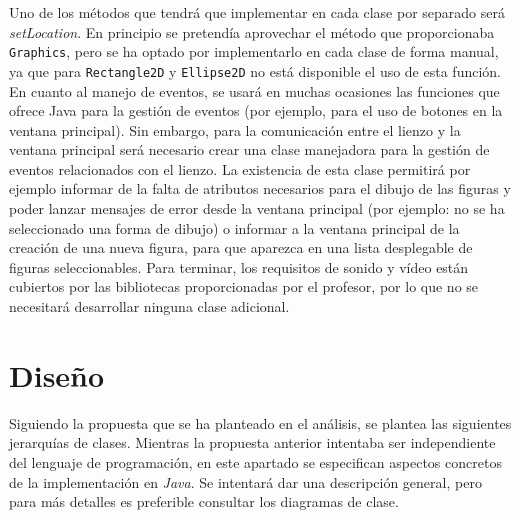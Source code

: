 \vskip0.3cm
Uno de los métodos que tendrá que implementar en cada clase por separado será \textit{setLocation}. En principio se pretendía aprovechar el método que proporcionaba \texttt{Graphics}, pero se ha optado por implementarlo en cada clase de forma manual, ya que para \texttt{Rectangle2D} y \texttt{Ellipse2D} no está disponible el uso de esta función.
\vskip0.3cm
En cuanto al manejo de eventos, se usará en muchas ocasiones las funciones que ofrece Java para la gestión de eventos (por ejemplo, para el uso de botones en la ventana principal). Sin embargo, para la comunicación entre el lienzo y la ventana principal será necesario crear una clase manejadora para la gestión de eventos relacionados con el lienzo. La existencia de esta clase permitirá por ejemplo informar de la falta de atributos necesarios para el dibujo de las figuras y poder lanzar mensajes de error desde la ventana principal (por ejemplo: no se ha seleccionado una forma de dibujo) o informar a la ventana principal de la creación de una nueva figura, para que aparezca en una lista desplegable de figuras seleccionables. 
\vskip0.3cm
Para terminar, los requisitos de sonido y vídeo están cubiertos por las bibliotecas proporcionadas por el profesor, por lo que no se necesitará desarrollar ninguna clase adicional.
\clearpage
\section{Diseño}
Siguiendo la propuesta que se ha planteado en el análisis, se plantea las siguientes jerarquías de clases. Mientras la propuesta anterior intentaba ser independiente del lenguaje de programación, en este apartado se especifican aspectos concretos de la implementación en \textit{Java}.
\vskip0.3cm
Se intentará dar una descripción general, pero para más detalles es preferible consultar los diagramas de clase.
